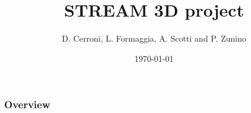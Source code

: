 \documentclass{beamer}
\title[GECO ]{STREAM 3D project} %
\author{D. Cerroni, L. Formaggia, A. Scotti and P. Zunino} %
\institute[MOX laboratory, Department of Mathematics] 
{
Politecnico di Milano\\ %
\medskip
}
\date{\today} %
\begin{document}
\begin{frame}
\titlepage %
\end{frame}
\begin{frame}
\frametitle{Overview} %
\tableofcontents %
\end{frame}
\end{document}
